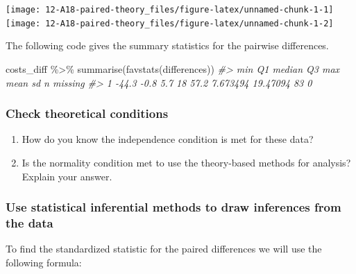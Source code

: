\documentclass[
]{report}
\newenvironment{Shaded}{\begin{snugshade}}{\end{snugshade}}
\newcommand{\CommentTok}[1]{\textcolor[rgb]{0.56,0.35,0.01}{\textit{#1}}}
\newcommand{\FunctionTok}[1]{\textcolor[rgb]{0.00,0.00,0.00}{#1}}
\newcommand{\NormalTok}[1]{#1}
\newcommand{\SpecialCharTok}[1]{\textcolor[rgb]{0.00,0.00,0.00}{#1}}
\begin{document}
\begin{center}\texttt{[image: 12-A18-paired-theory\_files/figure-latex/unnamed-chunk-1-1]} \texttt{[image: 12-A18-paired-theory\_files/figure-latex/unnamed-chunk-1-2]} \end{center}

The following code gives the summary statistics for the pairwise differences.

\begin{Shaded}
\begin{Highlighting}[]
\NormalTok{costs\_diff }\SpecialCharTok{\%\textgreater{}\%} 
  \FunctionTok{summarise}\NormalTok{(}\FunctionTok{favstats}\NormalTok{(differences))}
\CommentTok{\#\textgreater{}     min   Q1 median Q3  max     mean       sd  n missing}
\CommentTok{\#\textgreater{} 1 {-}44.3 {-}0.8    5.7 18 57.2 7.673494 19.47094 83       0}
\end{Highlighting}
\end{Shaded}

\hypertarget{check-theoretical-conditions}{%
\subsubsection{Check theoretical conditions}\label{check-theoretical-conditions}}

\begin{enumerate}
\def\labelenumi{\arabic{enumi}.}
\setcounter{enumi}{4}
\item
  How do you know the independence condition is met for these data?
  \vspace{0.8in}
\item
  Is the normality condition met to use the theory-based methods for analysis? Explain your answer.
  \vspace{1in}
\end{enumerate}

\hypertarget{use-statistical-inferential-methods-to-draw-inferences-from-the-data-1}{%
\subsubsection*{Use statistical inferential methods to draw inferences from the data}\label{use-statistical-inferential-methods-to-draw-inferences-from-the-data-1}}

To find the standardized statistic for the paired differences we will use the following formula:
\end{document}
